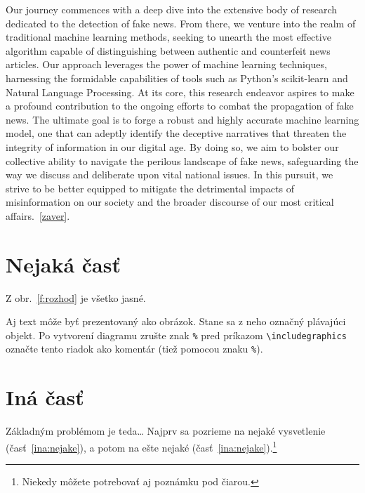 \documentclass[10pt,twoside,slovak,a4paper]{article}
\begin{document}
Our journey commences with a deep dive into the extensive body of research dedicated to the detection of fake news. From there, we venture into the realm of traditional machine learning methods, seeking to unearth the most effective algorithm capable of distinguishing between authentic and counterfeit news articles. Our approach leverages the power of machine learning techniques, harnessing the formidable capabilities of tools such as Python's scikit-learn and Natural Language Processing.
At its core, this research endeavor aspires to make a profound contribution to the ongoing efforts to combat the propagation of fake news. The ultimate goal is to forge a robust and highly accurate machine learning model, one that can adeptly identify the deceptive narratives that threaten the integrity of information in our digital age. By doing so, we aim to bolster our collective ability to navigate the perilous landscape of fake news, safeguarding the way we discuss and deliberate upon vital national issues. In this pursuit, we strive to be better equipped to mitigate the detrimental impacts of misinformation on our society and the broader discourse of our most critical affairs.~\ref{zaver}.



\section{Nejaká časť} \label{nejaka}

Z obr.~\ref{f:rozhod} je všetko jasné. 

\begin{figure*}[tbh]
\centering
Aj text môže byť prezentovaný ako obrázok. Stane sa z neho označný plávajúci objekt. Po vytvorení diagramu zrušte znak \texttt{\%} pred príkazom \verb|\includegraphics| označte tento riadok ako komentár (tiež pomocou znaku \texttt{\%}).
\caption{Rozhodujúci argument.}
\label{f:rozhod}
\end{figure*}



\section{Iná časť} \label{ina}

Základným problémom je teda\ldots{} Najprv sa pozrieme na nejaké vysvetlenie (časť~\ref{ina:nejake}), a potom na ešte nejaké (časť~\ref{ina:nejake}).\footnote{Niekedy môžete potrebovať aj poznámku pod čiarou.}
\end{document}
